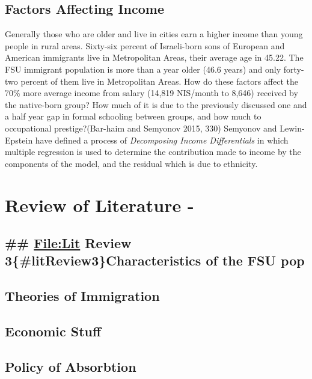 \documentclass[12pt,twoside]{reedthesis}
\begin{document}
  \section{Factors Affecting Income}\label{sec:orgheadline6}
  
  Generally those who are older and live in cities earn a higher income
  than young people in rural areas. Sixty-six percent of Israeli-born sons
  of European and American immigrants live in Metropolitan Areas, their
  average age in 45.22. The FSU immigrant population is more than a year
  older (46.6 years) and only forty-two percent of them live in
  Metropolitan Areas. How do these factors affect the 70\% more average
  income from salary (14,819 NIS/month to 8,646) received by the
  native-born group? How much of it is due to the previously discussed one
  and a half year gap in formal schooling between groups, and how much to
  occupational prestige?(Bar-haim and Semyonov 2015, 330) Semyonov and
  Lewin-Epstein have defined a process of \emph{Decomposing Income
  Differentials} in which multiple regression is used to determine the
  contribution made to income by the components of the model, and the
  residual which is due to ethnicity.
  
  \chapter{Review of Literature -}\label{review-of-literature--}
  
  \section{\texorpdfstring{\#\# \url{File:Lit} Review
  3\{\#litReview3\}Characteristics of the FSU
  pop}{\#\# File:Lit Review 3\{\#litReview3\}Characteristics of the FSU pop}}\label{filelit-review-3litreview3characteristics-of-the-fsu-pop}
  
  \section{Theories of Immigration}\label{theories-of-immigration}
  
  \section{Economic Stuff}\label{economic-stuff}
  
  \section{Policy of Absorbtion}\label{policy-of-absorbtion}
  
\end{document}

